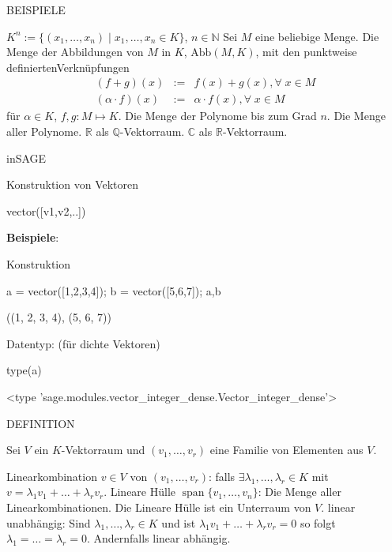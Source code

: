 \documentclass[fontsize=12pt,paper=a4,twoside,bibtotoc,idxtotoc,
liststotoc,pagesize,BCOR1.2cm,DIV15,chapterprefix,pagesize=pdftex]{scrbook}
\theoremstyle{plain}
\theoremstyle{definition}
\theoremstyle{remark}
\begin{document}
BEISPIELE


 $K^n := \{(x_1,\ldots,x_n) \;|\; x_1, \ldots, x_n \in K\}$, $n \in \mathbb{N}$
 Sei $M$ eine beliebige Menge. Die Menge der Abbildungen von $M$
  in $K$, $\text{Abb}(M,K)$, mit den punktweise definiertenVerknüpfungen
\begin{eqnarray*}
(f+g)(x) & :=& f(x)+g(x), \forall\; x \in M\\
(\alpha \cdot f)(x) & :=& \alpha \cdot f(x), \forall\; x \in M  
\end{eqnarray*}
für $\alpha \in K$, $f,g:M \mapsto K$.
 Die Menge der Polynome bis zum Grad $n$.
 Die Menge aller Polynome.
 $\mathbb{R}$ als $\mathbb{Q}$-Vektorraum.
 $\mathbb{C}$ als $\mathbb{R}$-Vektorraum.


inSAGE

Konstruktion von Vektoren
\begin{sagein}
vector([v1,v2,..]) 
\end{sagein}
\textbf{Beispiele}:

 Konstruktion
\begin{sagein}
a = vector([1,2,3,4]); b = vector([5,6,7]); a,b
\end{sagein}
\begin{small}
\begin{sage}
((1, 2, 3, 4), (5, 6, 7))
\end{sage}
\end{small}
 Datentyp:  (für dichte Vektoren)
\begin{sagein}
type(a)
\end{sagein}
\scriptsize{
\begin{sage}
<type 'sage.modules.vector_integer_dense.Vector_integer_dense'>
\end{sage}}


DEFINITION

Sei $V$ ein $K$-Vektorraum und $(v_1,\dots ,v_r)$ eine Familie von
Elementen aus $V$.

 {\color{red} Linearkombination} $v \in V$ von $(v_1,\dots ,v_r)$: 
  falls $\exists \lambda_1, \dots, \lambda_r \in K$  mit
  $ v= \lambda_1 v_1 + \dots + \lambda_r v_r$. 
 {\color{red} Lineare Hülle} $\mathop{span}\{v_1, \dots, v_n\}$: Die Menge aller Linearkombinationen. Die Lineare
  Hülle ist ein Unterraum von $V$.
 {\color{red} linear unabhängig}: 
  Sind $\lambda_1, \dots , \lambda_r \in K$ und ist $\lambda_1 v_1 +
  \dots + \lambda_r v_r=0$ so folgt $\lambda_1= \dots =
  \lambda_r=0$. Andernfalls {\color{red} linear abhängig}. 
\end{document}
